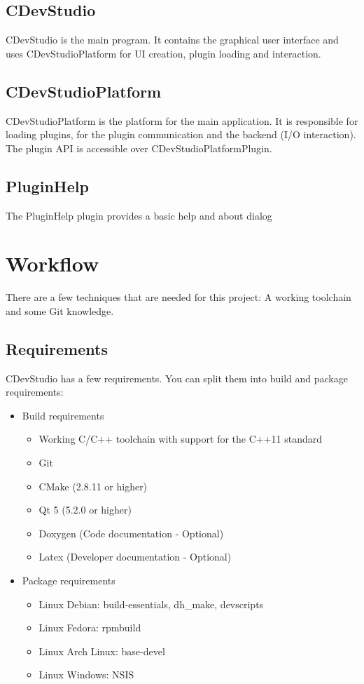 \documentclass{article}
\begin{document}
\subsection{CDevStudio}
CDevStudio is the main program. It contains the graphical user interface and uses CDevStudioPlatform for UI creation, plugin loading and interaction.

\subsection{CDevStudioPlatform}
CDevStudioPlatform is the platform for the main application. It is responsible for loading plugins, for the plugin communication and the backend (I/O interaction). The plugin API is accessible over CDevStudioPlatformPlugin.

\subsection{PluginHelp}
The PluginHelp plugin provides a basic help and about dialog

\section{Workflow}
There are a few techniques that are needed for this project: A working toolchain and some Git knowledge.

\subsection{Requirements}
CDevStudio has a few requirements. You can split them into build and package requirements:

\begin{itemize}
	\item Build requirements
	\begin{itemize}
		\item Working C/C++ toolchain with support for the C++11 standard
		\item Git
		\item CMake (2.8.11 or higher)
		\item Qt 5 (5.2.0 or higher)
		\item Doxygen (Code documentation - Optional)
		\item Latex (Developer documentation - Optional)
	\end{itemize}
	\item Package requirements
	\begin{itemize}
		\item Linux Debian: build-essentials, dh_make, devscripts
		\item Linux Fedora: rpmbuild
		\item Linux Arch Linux: base-devel
		\item Linux Windows: NSIS
	\end{itemize}
\end{itemize}
\end{document}
